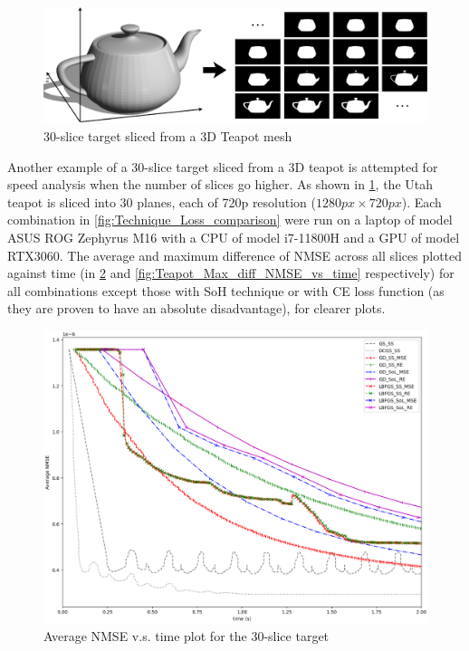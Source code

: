 \begin{figure}[H]
	\centering
	\includegraphics[width=1.0\textwidth]{Utah_teapot_target}
	\caption{30-slice target sliced from a 3D Teapot mesh}
	\label{fig:Teapot_target}
\end{figure}

Another example of a 30-slice target sliced from a 3D teapot is attempted for speed analysis when the number of slices go higher. As shown in \cref{fig:Teapot_target}, the Utah teapot \cite{Clark2015} is sliced into 30 planes, each of 720p resolution ($1280px\times720px$). Each combination in \cref{fig:Technique_Loss_comparison} were run on a laptop of model ASUS ROG Zephyrus M16 with a CPU of model i7-11800H and a GPU of model RTX3060. The average and maximum difference of NMSE across all slices plotted against time (in \cref{fig:Teapot_Average_NMSE_vs_time} and \cref{fig:Teapot_Max_diff_NMSE_vs_time} respectively) for all combinations except those with SoH technique or with CE loss function (as they are proven to have an absolute disadvantage), for clearer plots.

\begin{figure}[H]
	\centering
	\includegraphics[width=1.0\textwidth]{Teapot_Average_NMSE_vs_time}
	\caption{Average NMSE v.s. time plot for the 30-slice target}
	\label{fig:Teapot_Average_NMSE_vs_time}
\end{figure}

